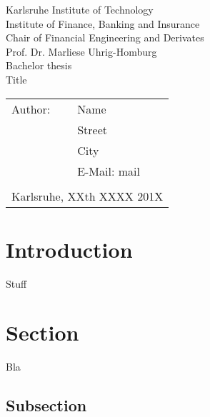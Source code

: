 \documentclass[a4paper,12pt]{article}%
\begin{document}
\begin{titlepage}
    \begin{center}
        {\Large Karlsruhe Institute of Technology\\[0.4cm]
            Institute of Finance, Banking and Insurance\\[0.3cm]
            Chair of Financial Engineering and Derivates\\[0.3cm]
            Prof. Dr. Marliese Uhrig-Homburg}\\[3.5cm]
        {\large Bachelor thesis}\\[1.5cm]
        {\Huge Title}\\[8cm]
    \end{center}
    \renewcommand{\baselinestretch}{1.2}\small\normalsize
    \begin{tabular}{ll}
        Author:  & Name\\
        & Street\\
        & City\\
        & E-Mail: mail\\\\
        \multicolumn{2}{l}{Karlsruhe, XXth XXXX 201X}
    \end{tabular}
    \vfill
\end{titlepage}

\sloppy

\onehalfspacing

\pagebreak%
\doublespacing %

\setcounter{page}{1}
\tableofcontents
\newpage
\listoffigures
{}
\newpage
\listoftables
{}
\newpage


\setcounter{page}{1}
\section{Introduction}
Stuff

\section{Section}
Bla

\subsection{Subsection}
\end{document}
